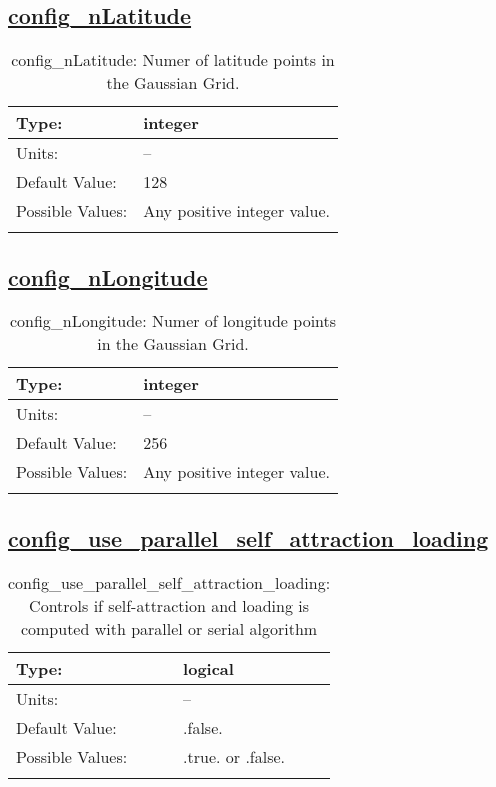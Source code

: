 \subsection[config\_nLatitude]{\hyperref[sec:nm_tab_self_attraction_loading]{config\_nLatitude}}
\label{subsec:nm_sec_config_nLatitude}
\begin{center}
\begin{longtable}{| p{2.0in} || p{4.0in} |}
    \hline
    Type: & integer \\
    \hline
    Units: & -- \\
    \hline
    Default Value: & 128 \\
    \hline
    Possible Values: & Any positive integer value. \\
    \hline
    \caption{config\_nLatitude: Numer of latitude points in the Gaussian Grid.}
\end{longtable}
\end{center}
\subsection[config\_nLongitude]{\hyperref[sec:nm_tab_self_attraction_loading]{config\_nLongitude}}
\label{subsec:nm_sec_config_nLongitude}
\begin{center}
\begin{longtable}{| p{2.0in} || p{4.0in} |}
    \hline
    Type: & integer \\
    \hline
    Units: & -- \\
    \hline
    Default Value: & 256 \\
    \hline
    Possible Values: & Any positive integer value. \\
    \hline
    \caption{config\_nLongitude: Numer of longitude points in the Gaussian Grid.}
\end{longtable}
\end{center}
\subsection[config\_use\_parallel\_self\_attraction\_loading]{\hyperref[sec:nm_tab_self_attraction_loading]{config\_use\_parallel\_self\_attraction\_loading}}
\label{subsec:nm_sec_config_use_parallel_self_attraction_loading}
\begin{center}
\begin{longtable}{| p{2.0in} || p{4.0in} |}
    \hline
    Type: & logical \\
    \hline
    Units: & -- \\
    \hline
    Default Value: & .false. \\
    \hline
    Possible Values: & .true. or .false. \\
    \hline
    \caption{config\_use\_parallel\_self\_attraction\_loading: Controls if self-attraction and loading is computed with parallel or serial algorithm}
\end{longtable}
\end{center}
